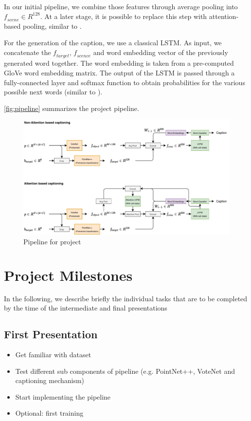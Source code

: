 \documentclass[10pt,twocolumn,letterpaper]{article}
\begin{document}
In our initial pipeline, we combine those features through average pooling into $\mathit{f_{scene}}\in R^{128}$. At a later stage, it is possible to replace this step with attention-based pooling, similar to \cite{anderson2018bottom}.

For the generation of the caption, we use a classical LSTM. As input, we concatenate the $\mathit{f_{target}}$, $\mathit{f_{scence}}$ and word embedding vector of the previously generated word together. The word embedding is taken from a pre-computed GloVe \cite{pennington2014glove} word embedding matrix. The output of the LSTM is passed through a fully-connected layer and softmax function to obtain probabilities for the various possible next words (similar to \cite{xu2015show}).

\autoref{fig:pipeline} summarizes the project pipeline.

\begin{figure}
	\centering
	\includegraphics[width=\textwidth]{figures/pipeline_sketch.pdf}
	\caption{Pipeline for project}
	\label{fig:pipeline}
\end{figure}

\section{Project Milestones}
In the following, we describe briefly the individual tasks that are to be completed by the time of the intermediate and final presentations
\subsection{First Presentation}
\begin{itemize}
	\setlength\itemsep{0em}
	\item Get familiar with dataset
	\item Test different sub components of pipeline (e.g. PointNet++, VoteNet and captioning mechanism)
	\item Start implementing the pipeline
	\item Optional: first training
\end{itemize}
\end{document}

